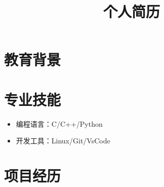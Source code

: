\documentclass[10pt,a4paper,sans]{moderncv} %
\title{个人简历}
\begin{document}
\makecvtitle %



\section{教育背景}




\section{专业技能}
\begin{itemize}
\setlength{\itemindent}{2em}
   \item 编程语言：C/C++/Python
  	\item 开发工具：Linux/Git/VsCode
\end{itemize}


\section{项目经历}
\end{document}
